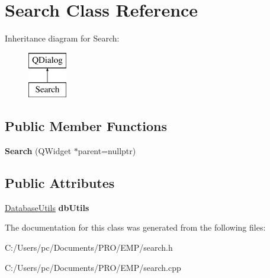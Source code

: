 \hypertarget{class_search}{}\section{Search Class Reference}
\label{class_search}
Inheritance diagram for Search\+:\begin{figure}[H]
\begin{center}
\leavevmode
\includegraphics[height=2.000000cm]{class_search}
\end{center}
\end{figure}
\subsection*{Public Member Functions}
\begin{DoxyCompactItemize}
\item 
\mbox{\label{class_search_a7010bf2c93cc36c96a19ae568a58fb28}} 
{\bfseries Search} (Q\+Widget $\ast$parent=nullptr)
\end{DoxyCompactItemize}
\subsection*{Public Attributes}
\begin{DoxyCompactItemize}
\item 
\mbox{\label{class_search_ae15bf78c3cb5b09062d436929ce82d5b}} 
\mbox{\hyperlink{class_database_utils}{Database\+Utils}} {\bfseries db\+Utils}
\end{DoxyCompactItemize}


The documentation for this class was generated from the following files\+:\begin{DoxyCompactItemize}
\item 
C\+:/\+Users/pc/\+Documents/\+P\+R\+O/\+E\+M\+P/search.\+h\item 
C\+:/\+Users/pc/\+Documents/\+P\+R\+O/\+E\+M\+P/search.\+cpp\end{DoxyCompactItemize}

